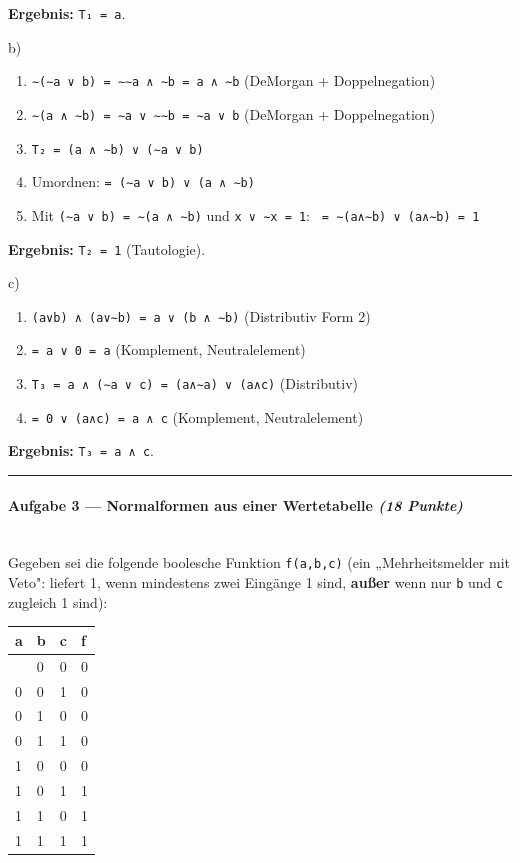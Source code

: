 \documentclass[11pt, a4paper]{article}
\begin{document}
\textbf{Ergebnis:} \texttt{T₁ = a}.


b)

\begin{enumerate}
  \item \texttt{∼(∼a ∨ b) = ∼∼a ∧ ∼b = a ∧ ∼b} (DeMorgan + Doppelnegation)
  \item \texttt{∼(a ∧ ∼b) = ∼a ∨ ∼∼b = ∼a ∨ b} (DeMorgan + Doppelnegation)
  \item \texttt{T₂ = (a ∧ ∼b) ∨ (∼a ∨ b)}
  \item Umordnen: \texttt{= (∼a ∨ b) ∨ (a ∧ ∼b)}
  \item Mit \texttt{(∼a ∨ b) = ∼(a ∧ ∼b)} und \texttt{x ∨ ∼x = 1}: \texttt{ = ∼(a∧∼b) ∨ (a∧∼b) = 1}
\end{enumerate}

\textbf{Ergebnis:} \texttt{T₂ = 1} (Tautologie).


c)

\begin{enumerate}
  \item \texttt{(a∨b) ∧ (a∨∼b) = a ∨ (b ∧ ∼b)} (Distributiv Form 2)
  \item \texttt{= a ∨ 0 = a} (Komplement, Neutralelement)
  \item \texttt{T₃ = a ∧ (∼a ∨ c) = (a∧∼a) ∨ (a∧c)} (Distributiv)
  \item \texttt{= 0 ∨ (a∧c) = a ∧ c} (Komplement, Neutralelement)
\end{enumerate}

\textbf{Ergebnis:} \texttt{T₃ = a ∧ c}.



\noindent\textcolor{rulegray}{\rule{\linewidth}{0.4pt}}


\paragraph{Aufgabe 3 — Normalformen aus einer Wertetabelle \textit{(18 Punkte)}}\mbox{}\\[2pt]

Gegeben sei die folgende boolesche Funktion \texttt{f(a,b,c)} (ein „Mehrheitsmelder mit Veto": liefert 1, wenn mindestens zwei Eingänge 1 sind, \textbf{außer} wenn nur \texttt{b} und \texttt{c} zugleich 1 sind):



{\small
\begin{tabularx}{\linewidth}{XXXX}
\hline
\rowcolor{tableheadbg}
{\color{white}\textbf{a}} & {\color{white}\textbf{b}} & {\color{white}\textbf{c}} & {\color{white}\textbf{f}} \\[2pt]
\hline
\endhead
\hline
\endfoot
0 & 0 & 0 & 0 \\
0 & 0 & 1 & 0 \\
0 & 1 & 0 & 0 \\
0 & 1 & 1 & 0 \\
1 & 0 & 0 & 0 \\
1 & 0 & 1 & 1 \\
1 & 1 & 0 & 1 \\
1 & 1 & 1 & 1 \\
\end{tabularx}
}
\end{document}
